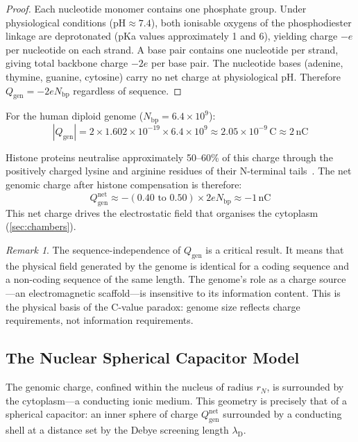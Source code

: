 \documentclass[12pt,a4paper]{article}
\theoremstyle{definition}
\theoremstyle{remark}
\newtheorem{remark}[theorem]{Remark}
\newcommand{\lD}{\lambda_{\mathrm{D}}}
\newcommand{\Qgen}{Q_{\mathrm{gen}}}
\newcommand{\abs}[1]{\left|#1\right|}
\begin{document}
\begin{proof}
Each nucleotide monomer contains one phosphate group. Under physiological conditions ($\mathrm{pH} \approx 7.4$), both ionisable oxygens of the phosphodiester linkage are deprotonated (pKa values approximately 1 and 6), yielding charge $-e$ per nucleotide on each strand. A base pair contains one nucleotide per strand, giving total backbone charge $-2e$ per base pair. The nucleotide bases (adenine, thymine, guanine, cytosine) carry no net charge at physiological pH. Therefore $\Qgen = -2e N_{\mathrm{bp}}$ regardless of sequence.
\end{proof}

For the human diploid genome ($N_{\mathrm{bp}} = 6.4 \times 10^9$):
\begin{equation}
  \abs{\Qgen} = 2 \times 1.602 \times 10^{-19} \times 6.4 \times 10^9 \approx 2.05 \times 10^{-9}\,\mathrm{C} \approx 2\,\mathrm{nC}
\end{equation}

Histone proteins neutralise approximately 50--60\% of this charge through the positively charged lysine and arginine residues of their N-terminal tails~\cite{Luger1997,Hansen2002}. The net genomic charge after histone compensation is therefore:
\begin{equation}
  \Qgen^{\mathrm{net}} \approx -(0.40\text{ to }0.50) \times 2e N_{\mathrm{bp}} \approx -1\,\mathrm{nC}
  \label{eq:net_genome_charge}
\end{equation}
This net charge drives the electrostatic field that organises the cytoplasm (\cref{sec:chambers}).

\begin{remark}
The sequence-independence of $\Qgen$ is a critical result. It means that the physical field generated by the genome is identical for a coding sequence and a non-coding sequence of the same length. The genome's role as a charge source---an electromagnetic scaffold---is insensitive to its information content. This is the physical basis of the C-value paradox: genome size reflects charge requirements, not information requirements.
\end{remark}

\subsection{The Nuclear Spherical Capacitor Model}

The genomic charge, confined within the nucleus of radius $r_N$, is surrounded by the cytoplasm---a conducting ionic medium. This geometry is precisely that of a spherical capacitor: an inner sphere of charge $\Qgen^{\mathrm{net}}$ surrounded by a conducting shell at a distance set by the Debye screening length $\lD$.
\end{document}
